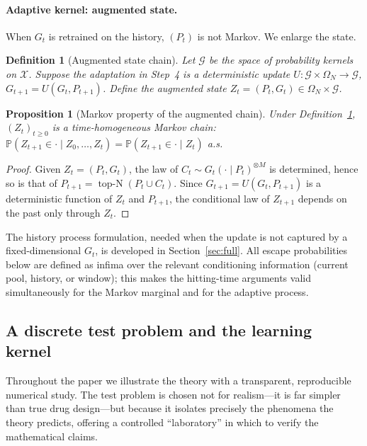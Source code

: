 \documentclass[11pt,a4paper]{article}
\newtheorem{proposition}[theorem]{Proposition}
\newtheorem{definition}[theorem]{Definition}
\newcommand{\X}{\mathcal{X}}
\newcommand{\G}{\mathcal{G}}
\newcommand{\Omn}{\Omega_N}
\newcommand{\Prob}{\mathbb{P}}
\DeclareMathOperator{\topN}{top\text{-}N}
\begin{document}
\paragraph{Adaptive kernel: augmented state.}
When $G_t$ is retrained on the history, $(P_t)$ is not Markov.  We
enlarge the state.

\begin{definition}[Augmented state chain]\label{def:augmented}
  Let $\G$ be the space of probability kernels on $\X$.  Suppose the
  adaptation in Step~4 is a deterministic update
  $U\colon\G\times\Omn\to\G$, $G_{t+1}=U(G_t,P_{t+1})$.  Define the
  \emph{augmented state} $Z_t=(P_t,G_t)\in\Omn\times\G$.
\end{definition}

\begin{proposition}[Markov property of the augmented chain]
\label{prop:markov}
  Under Definition~\ref{def:augmented}, $(Z_t)_{t\ge0}$ is a
  time-homogeneous Markov chain:
  $\Prob(Z_{t+1}\in\cdot\mid Z_0,\dots,Z_t)
   =\Prob(Z_{t+1}\in\cdot\mid Z_t)$ a.s.
\end{proposition}

\begin{proof}
  Given $Z_t=(P_t,G_t)$, the law of $C_t\sim G_t(\cdot\mid P_t)^{\otimes
  M}$ is determined, hence so is that of $P_{t+1}=\topN(P_t\cup C_t)$.
  Since $G_{t+1}=U(G_t,P_{t+1})$ is a deterministic function of $Z_t$ and
  $P_{t+1}$, the conditional law of $Z_{t+1}$ depends on the past only
  through $Z_t$.
\end{proof}

The history process formulation, needed when the update is not captured
by a fixed-dimensional $G_t$, is developed in Section~\ref{sec:full}.
All escape probabilities below are defined as infima over the relevant
conditioning information (current pool, history, or window); this makes
the hitting-time arguments valid simultaneously for the Markov marginal
and for the adaptive process.

\subsection{A discrete test problem and the learning kernel}
\label{sec:num-setup}

Throughout the paper we illustrate the theory with a transparent,
reproducible numerical study.  The test problem is chosen not for
realism---it is far simpler than true drug design---but because it
isolates precisely the phenomena the theory predicts, offering a
controlled ``laboratory'' in which to verify the mathematical claims.
\end{document}
